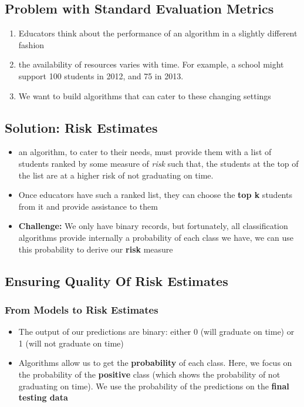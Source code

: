 \documentclass{article}
\begin{document}
\subsection{Problem with Standard Evaluation Metrics}
\begin{enumerate}
\item Educators think about the performance of an algorithm in a slightly different fashion
\item the availability of resources varies with time. For example, a school might support 100 students in 2012, and 75 in 2013. 
\item We want to build algorithms that can cater to these changing settings
\end{enumerate}

\subsection{Solution: Risk Estimates}
\begin{itemize}
\item an algorithm, to cater to their needs, must provide them with a list of students ranked by some measure of \textit{risk} such that, the students at the top of the list are at a higher risk of not graduating on time.

\item Once educators have such a ranked list, they can choose the \textbf{top k} students from it and provide assistance to them

\item \textbf{Challenge:} We only have binary records, but fortunately, all classification algorithms provide internally a probability of each class we have, we can use this probability to derive our \textbf{risk} measure
\end{itemize}

\subsection{Ensuring Quality Of Risk 
Estimates}
\subsubsection{From Models to Risk Estimates}
\begin{itemize}
\item The output of our predictions are binary: either 0 (will graduate on time) or 1 (will not graduate on time)
\item Algorithms allow us to get the  \textbf{probability} of each class. Here, we focus on the probability of the \textbf{positive} class (which shows the probability of not graduating on time). We use the probability of the predictions on the \textbf{final testing data }
\end{itemize}
\end{document}

